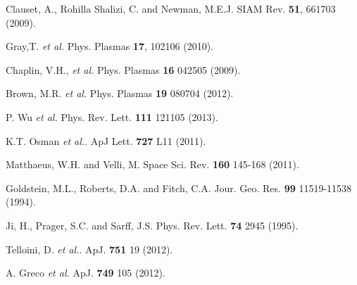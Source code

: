 \documentclass[aps,prl,amsmath,amssymb,reprint,superscriptaddress]{revtex4-1} %
\begin{document}
\begin{thebibliography}{99}
Clauset, A., Rohilla Shalizi, C. and Newman, M.E.J. SIAM Rev. {\bf 51}, 661703 (2009).

Gray,T. {\it et al.} Phys. Plasmas {\bf 17}, 102106 (2010).

Chaplin, V.H., {\it et al.} Phys. Plasmas {\bf 16} 042505 (2009).

Brown, M.R. {\it et al.} Phys. Plasmas {\bf 19} 080704 (2012).

P. Wu {\it et al.} Phys. Rev. Lett. {\bf 111} 121105 (2013).

K.T. Osman {\it et al.}. ApJ Lett. {\bf 727} L11 (2011).

Matthaeus, W.H. and Velli, M. Space Sci. Rev. {\bf 160} 145-168 (2011).

Goldstein, M.L., Roberts, D.A. and Fitch, C.A. Jour. Geo. Res. {\bf 99} 11519-11538 (1994).

Ji, H., Prager, S.C. and Sarff, J.S. Phys. Rev. Lett. {\bf 74} 2945 (1995).

Telloini, D. {\it et al.}. ApJ. {\bf 751} 19 (2012).

A. Greco {\it et al.} ApJ. {\bf 749} 105 (2012).

\end{thebibliography}
\end{document}
